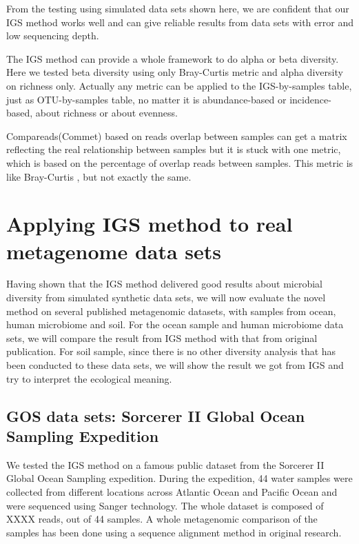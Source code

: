From the testing using simulated data sets shown here, we are confident that 
our IGS method works well and can give reliable results from data sets with 
error and low sequencing depth.

The IGS method can provide a whole framework to do alpha or beta diversity. 
Here we tested beta diversity using only Bray-Curtis metric and alpha 
diversity on richness only. Actually any metric can be applied to the 
IGS-by-samples table, just as OTU-by-samples table, 
no matter it is abundance-based or incidence-based, about richness or about 
evenness.

Compareads(Commet) based on reads overlap between samples can get a matrix 
reflecting the real relationship between samples but it is stuck with one 
metric, which is based on the percentage of overlap reads between samples. 
This metric is like Bray-Curtis , but not exactly the same.


\section{Applying IGS method to real metagenome data sets}

Having shown that the IGS method delivered good results about microbial diversity 
from simulated synthetic data sets, 
we will now evaluate the novel method on several published metagenomic 
datasets, with samples 
from ocean, human microbiome and soil. For the ocean sample and human microbiome 
data sets, we will compare the result from IGS method
with that from original publication. For soil sample, since there is no other 
diversity analysis that has been conducted
to these data sets, we will show the result we got from IGS and try to 
interpret the ecological meaning.


\subsection{GOS data sets: Sorcerer II Global Ocean Sampling Expedition}

We tested the IGS method on a famous public dataset from the Sorcerer II 
Global Ocean Sampling expedition.
During the expedition, 44 water samples were collected from different locations across
Atlantic Ocean and Pacific Ocean and were sequenced using Sanger technology. 
The whole dataset is composed of XXXX reads, out of 44 samples.
A whole metagenomic comparison of the samples has been done
using a sequence alignment method in original research. 

